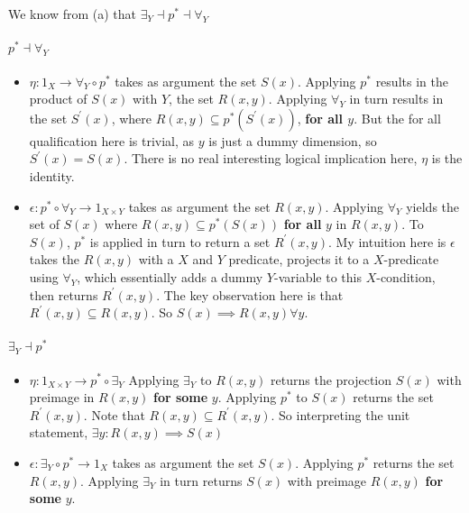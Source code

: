 \documentclass{article}
\begin{document}
We know from (a) that $\exists_Y \dashv p^* \dashv \forall_Y $

\paragraph{$p^* \dashv \forall_Y$}

\begin{itemize}
\item $\eta: 1_X \rightarrow  \forall_Y \circ p^*$ takes as argument the set $S(x)$. Applying $p^*$ results in the product of $S(x)$ with $Y$, the set $R(x,y)$.  Applying $\forall_Y$ in turn results in the set $S^\prime(x)$, where $R(x,y) \subseteq p^*(S^\prime(x))$, \textbf{for all $y$}. But the for all qualification here is trivial, as $y$ is just a dummy dimension, so $S^\prime(x) = S(x)$. There is no real interesting logical implication here, $\eta$ is the identity.
\item $\epsilon: p^* \circ \forall_Y \rightarrow 1_{X \times Y}$ takes as argument the set $R(x,y)$. Applying $\forall_Y$ yields the set of $S(x)$ where $R(x,y) \subseteq p^*(S(x))$ \textbf{for all} $y$ in $R(x,y)$. To $S(x)$, $p^*$ is applied in turn to return a set $R^\prime(x,y)$. My intuition here is $\epsilon$ takes the $R(x,y)$ with a $X$ and $Y$ predicate, projects it to a $X$-predicate using $\forall_Y$, which essentially adds a dummy $Y$-variable to this $X$-condition, then returns $R^\prime(x,y)$. The key observation here is that $R^\prime(x,y) \subseteq R(x,y)$.  So $S(x) \implies R(x,y) \forall y$.
\end{itemize}

\paragraph{$\exists_Y \dashv p^*$}

\begin{itemize}
\item $\eta: 1_{X \times Y} \rightarrow p^* \circ \exists_Y$ Applying $\exists_Y$ to $R(x,y)$ returns the projection $S(x)$ with preimage in $R(x,y)$ \textbf{for some} $y$. Applying $p^*$ to $S(x)$ returns the set $R^\prime(x,y)$. Note that $R(x,y) \subseteq R^\prime(x,y)$. So interpreting the unit statement, $\exists y: R(x,y) \implies S(x)$
\item $\epsilon: \exists_Y \circ p^* \rightarrow 1_X $ takes as argument the set $S(x)$. Applying $p^*$ returns the set $R(x,y)$. Applying $\exists_Y$ in turn returns $S(x)$ with preimage $R(x,y)$ \textbf{for some} $y$.
\end{itemize}
\end{document}
